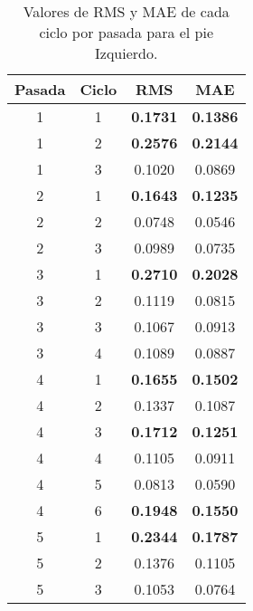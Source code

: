 \begin{table}[H]
\centering
\renewcommand{\arraystretch}{1.2}
\begin{tabular}{|c|c|c|c|}
\hline
\textbf{Pasada} & \textbf{Ciclo} & \textbf{RMS} & \textbf{MAE} \\
\hline
1 & 1 & \textbf{0.1731} & \textbf{0.1386} \\
\hline
1 & 2 & \textbf{0.2576} & \textbf{0.2144} \\
\hline
1 & 3 & 0.1020 & 0.0869 \\
\hline
2 & 1 & \textbf{0.1643} & \textbf{0.1235} \\
\hline
2 & 2 & 0.0748 & 0.0546 \\
\hline
2 & 3 & 0.0989 & 0.0735 \\
\hline
3 & 1 & \textbf{0.2710} & \textbf{0.2028} \\
\hline
3 & 2 & 0.1119 & 0.0815 \\
\hline
3 & 3 & 0.1067 & 0.0913 \\
\hline
3 & 4 & 0.1089 & 0.0887 \\
\hline
4 & 1 & \textbf{0.1655} & \textbf{0.1502} \\
\hline
4 & 2 & 0.1337 & 0.1087 \\
\hline
4 & 3 & \textbf{0.1712} & \textbf{0.1251} \\
\hline
4 & 4 & 0.1105 & 0.0911 \\
\hline
4 & 5 & 0.0813 & 0.0590 \\
\hline
4 & 6 & \textbf{0.1948} & \textbf{0.1550} \\
\hline
5 & 1 & \textbf{0.2344} & \textbf{0.1787} \\
\hline
5 & 2 & 0.1376 & 0.1105 \\
\hline
5 & 3 & 0.1053 & 0.0764 \\
\hline
\end{tabular}
\caption{Valores de RMS y MAE de cada ciclo por pasada para el pie Izquierdo.}
\label{tab:rms_mae_pie_izquierdo}
\end{table}
